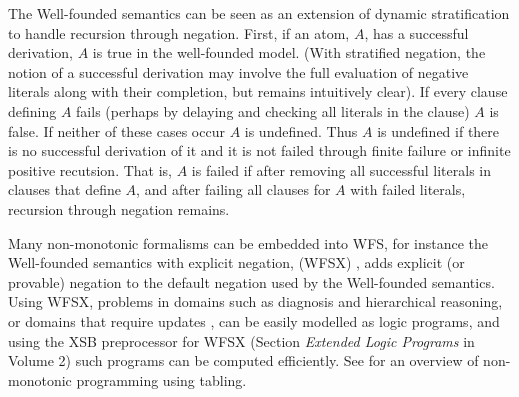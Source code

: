 The Well-founded semantics can be seen as an extension of dynamic
stratification to handle recursion through negation.  First, if an
atom, $A$, has a successful derivation, $A$ is true in the
well-founded model.  (With stratified negation, the notion of a
successful derivation may involve the full evaluation of negative
literals along with their completion, but remains intuitively clear).
If every clause defining $A$ fails (perhaps by delaying and checking
all literals in the clause) $A$ is false.  If neither of these cases
occur $A$ is undefined.  Thus $A$ is undefined if there is no
successful derivation of it and it is not failed through finite
failure or infinite positive recutsion.  That is, $A$ is failed if
after removing all successful literals in clauses that define $A$, and
after failing all clauses for $A$ with failed literals, recursion
through negation remains.

Many non-monotonic formalisms can be embedded into WFS, for instance
the Well-founded semantics with explicit negation, (WFSX)
\cite{ADP95}, adds explicit (or provable) negation to the default
negation used by the Well-founded semantics.  Using WFSX, problems in
domains such as diagnosis and hierarchical reasoning, or domains that
require updates \cite{Leit97}, can be easily modelled as logic
programs, and using the XSB preprocessor for WFSX (Section {\it
Extended Logic Programs} in Volume 2) such programs can be computed
efficiently.  See \cite{Swif99a} for an overview of non-monotonic
programming using tabling.

